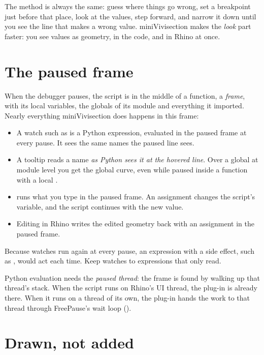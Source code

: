 The method is always the same: guess where things go wrong, set a breakpoint just before that place,
look at the values, step forward, and narrow it down until you see the line that makes a wrong value.
miniVivisection makes the \emph{look} part faster: you see values as geometry, in the code, and in
Rhino at once.

\section{The paused frame}\label{sec:frame}

When the debugger pauses, the script is in the middle of a function, a \emph{frame}, with its local
variables, the globals of its module and everything it imported. Nearly everything miniVivisection
does happens in this frame:

\begin{itemize}
  \item A watch such as  is a Python expression, evaluated in the paused
        frame at every pause. It sees the same names the paused line sees.
  \item A tooltip reads a name \emph{as Python sees it at the hovered line}. Over a global 
        at module level you get the global curve, even while paused inside a function with a local
        .
  \item {} runs what you type in the paused frame. An assignment changes the script's
        variable, and the script continues with the new value.
  \item Editing in Rhino writes the edited geometry back with an assignment in the paused frame.
\end{itemize}

Because watches run again at every pause, an expression with a side effect, such as
, would act each time. Keep watches to expressions that only read.

Python evaluation needs the \emph{paused thread}: the frame is found by walking up that thread's
stack. When the script runs on Rhino's UI thread, the plug-in is already there. When it runs on a
thread of its own, the plug-in hands the work to that thread through FreePause's wait loop
().

\section{Drawn, not added}\label{sec:drawn}

